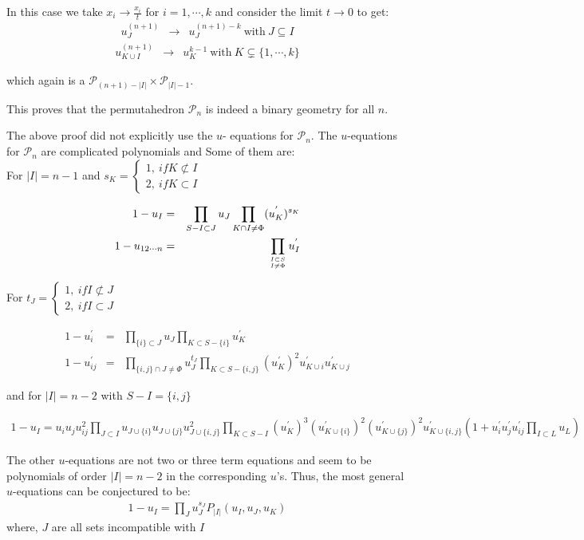 \documentclass[hidelinks,12pt]{article}
\newcommand{\bea}[1]{\begin{eqnarray}\label{#1} }
\newcommand{\eea}{\end{eqnarray}}
\def\bea{\begin{eqnarray}}
\def\eea{\end{eqnarray}}
\begin{document}
\begin{enumerate}
    In this case we take $x_i \rightarrow \frac{x_i}{t}$ for $i=1,\cdots, k$ and consider the limit $t \rightarrow 0$ to get:
    \bea
    u^{(n+1)}_{J} &\rightarrow& u_{J}^{(n+1)-k} ~\text{with}~ J\subseteq I
    \eea
     \bea
    u^{(n+1)}_{K \cup I} &\rightarrow& u_{K}^{k-1} ~\text{with}~ K\subsetneq \{1,\cdots,k\}
    \eea
    
     which again is a $\mathscr P_{(n+1)-|I|} \times \mathscr P_{|I|-1}$. 
\end{enumerate}
This proves that the permutahedron $\mathscr P_n$ is indeed a binary geometry for all $n$.

The above proof did not explicitly use the $u$- equations for $\mathscr P_n$. 
The $u$-equations for $\mathscr P_n$ are complicated polynomials and Some of them are:\\

For $|I| =n-1$ and $s_K = \begin{cases}  1,~ if K \not\subset I & \\ 2, ~if K \subset I\end{cases}$

\bea
1-u_{I} &=& \prod_ {S - I \subset J } u_{J} \prod_ {K \cap I \ne \Phi } (u^{'}_{K})^{s_K}  \nonumber \\
1-u_{12\cdots n} &=& \prod_ {{I \subset S}\atop {I \ne \Phi}} u^{'}_{I} \nonumber
\eea

For $t_J = \begin{cases}  1,~ if I  \not\subset J & \\ 2, ~if I \subset J \end{cases}$

\bea
1-u^{'}_{i} &=& \prod_ {\{ i \} \subset J } u_{J} \prod_ {K \subset S- \{i\} } u^{'}_{K} \nonumber \\
1-u^{'}_{i j} &=& \prod_ {\{i,j \}\cap J \ne \Phi} u^{t_J}_{J} \prod_ {K \subset S-\{i, j \} } (u^{'}_{K})^{2} u^{'}_{K \cup {i}} u^{'}_{K \cup{j} } \nonumber 
\eea

and for $|I| =n-2$ with $S- I = \{i, j\}$

\bea
1-u_{I}= u_i u_j u^{2}_{ij} \prod_{J \subset I} u_{J \cup \{i\}} u_{J \cup \{j\}} u^{2}_{J \cup \{i,j\}} \prod_{K \subset S-I} (u^{'}_K)^{3} (u^{'}_{K \cup \{i\}})^{2}  (u^{'}_{K \cup\{j\}})^{2}  u^{'}_{K\cup \{i,j\}} \left( 1+ u^{'}_i u^{'}_j u^{'}_{ij} \prod_{I \subset L} u_L \right)                       \nonumber
\eea
   
The other $u$-equations are not two or three term equations and seem to be polynomials of order $|I|=n-2$ in the corresponding $u$'s. Thus, the most general $u$-equations can be conjectured to be:
\bea
1-u_{I} = \prod_{J} u^{s_J}_{J} P_{|I|}(u_I, u_J,u_K) 
\eea
where, $J$ are all sets incompatible with $I$
\end{document}
